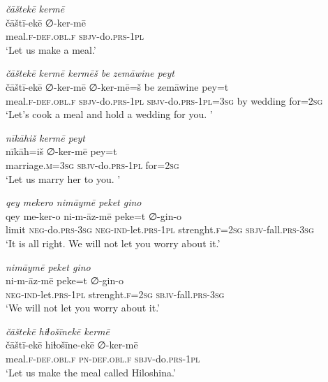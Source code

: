\ea \label{ŽP.231}
\textit{čāštekē kermē} \\ 
\gll čāštī-ekē ∅-ker-mē \\ 
 meal\textsc{.f}\textsc{-def}\textsc{.obl}\textsc{.f} \textsc{sbjv-}do\textsc{.prs}\textsc{-1pl} \\ 
\glt `Let us make a meal.'
\z 
 
\ea \label{ŽP.232}
\textit{čāštekē kermē kermēš be zemāwine peyt} \\ 
\gll čāštī-ekē ∅-ker-mē ∅-ker-mē=š be zemāwine pey=t \\ 
 meal\textsc{.f}\textsc{-def}\textsc{.obl}\textsc{.f} \textsc{sbjv-}do\textsc{.prs}\textsc{-1pl} \textsc{sbjv-}do\textsc{.prs}\textsc{-1pl}\textsc{=3sg} by wedding for\textsc{=\textsc{2sg}} \\ 
\glt `Let’s cook a meal and hold a wedding for you. '
\z 
 
\ea \label{ŽP.233}
\textit{nīkāhiš kermē peyt} \\ 
\gll nīkāh=iš ∅-ker-mē pey=t \\ 
 marriage\textsc{.m}\textsc{=3sg} \textsc{sbjv-}do\textsc{.prs}\textsc{-1pl} for\textsc{=\textsc{2sg}} \\ 
\glt `Let us marry her to you. '
\z 
 
\ea \label{ŽP.234}
\textit{qey mekero nimāymē peket gino} \\ 
\gll qey me-ker-o ni-m-āz-mē peke=t ∅-gin-o \\ 
 limit \textsc{neg-}do\textsc{.prs}\textsc{-3sg} \textsc{neg-}\textsc{ind-}let\textsc{.prs}\textsc{-1pl} strenght\textsc{.f}\textsc{=\textsc{2sg}} \textsc{sbjv-}fall\textsc{.prs}\textsc{-3sg} \\ 
\glt `It is all right. We will not let you worry about it.'
\z 
 
\ea \label{ŽP.235}
\textit{nimāymē peket gino} \\ 
\gll ni-m-āz-mē peke=t ∅-gin-o \\ 
 \textsc{neg-}\textsc{ind-}let\textsc{.prs}\textsc{-1pl} strenght\textsc{.f}\textsc{=\textsc{2sg}} \textsc{sbjv-}fall\textsc{.prs}\textsc{-3sg} \\ 
\glt `We will not let you worry about it.'
\z 
 
\ea \label{ŽP.241}
\textit{čāštekē hiɫošīnekē kermē} \\ 
\gll čāštī-ekē hiɫošīne-ekē ∅-ker-mē \\ 
 meal\textsc{.f}\textsc{-def}\textsc{.obl}\textsc{.f} \textsc{pn}\textsc{-def}\textsc{.obl}\textsc{.f} \textsc{sbjv-}do\textsc{.prs}\textsc{-1pl} \\ 
\glt `Let us make the meal called Hiloshina.'
\z 
 
